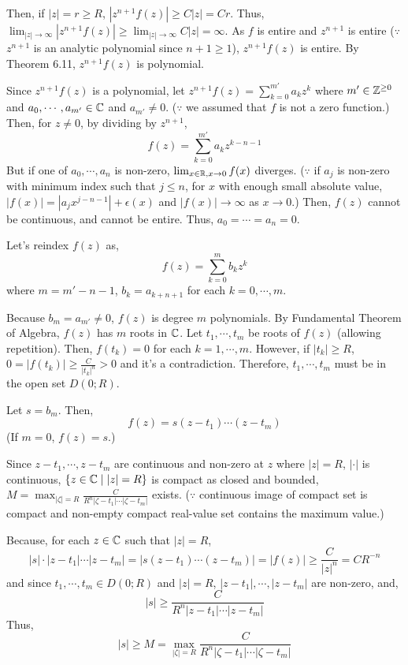 Then, if \(|z| = r \ge R\), \(|z^{n + 1} f(z)| \ge C |z| = Cr\).
Thus, \(\lim_{|z| \to \infty} |z^{n + 1} f(z)| \ge \lim_{|z| \to \infty} C |z| = \infty\).
As \(f\) is entire and \(z^{n + 1}\) is entire (\(\because\) \(z^{n + 1}\) is an analytic polynomial since \(n + 1 \ge 1\)), \(z^{n + 1}f(z)\) is entire.
By Theorem 6.11, \(z^{n + 1} f(z)\) is polynomial.

Since \(z^{n + 1} f(z)\) is a polynomial,
let \(z^{n + 1}f(z) = \sum_{k = 0}^{m'} a_k z^k\)
where \(m' \in \mathbb{Z}^{\ge 0}\) and
\(a_0, \cdots, a_{m'} \in \mathbb{C}\) and \(a_{m'} \neq 0\).
(\(\because\) we assumed that \(f\) is not a zero function.)
Then, for \(z \neq 0\), by dividing by \(z^{n + 1}\),
\[f(z) = \sum_{k = 0}^{m'} a_k z^{k - n - 1}\]
But if one of \(a_0, \cdots, a_{n}\) is non-zero,
\(\lim_{x \in \mathbb{R}, x \to 0} f(x)\) diverges.
(\(\because\) if \(a_j\) is non-zero with minimum index such that \(j \le n\),
 for \(x\) with enough small absolute value, \(|f(x)| = |a_j x^{j - n - 1}| + \epsilon(x)\) and \(|f(x)| \to \infty\) as \(x \to 0\).)
Then, \(f(z)\) cannot be continuous, and cannot be entire.
Thus, \(a_0 = \cdots = a_{n} = 0\).

Let's reindex \(f(z)\) as,
\[f(z) = \sum_{k = 0}^{m} b_k z^{k}\]
where \(m = m' - n - 1\), \(b_k = a_{k + n + 1}\) for each \(k = 0, \cdots, m\).

Because \(b_m = a_{m'} \neq 0\), \(f(z)\) is degree \(m\) polynomials.
By Fundamental Theorem of Algebra, \(f(z)\) has \(m\) roots in \(\mathbb{C}\).
Let \(t_1, \cdots, t_m\) be roots of \(f(z)\) (allowing repetition).
Then, \(f(t_k) = 0\) for each \(k = 1, \cdots, m\).
However, if \(|t_k| \ge R\),
\(0 = |f(t_k)| \ge \frac{C}{|t_k|^n} > 0\) and it's a contradiction.
Therefore, \(t_1, \cdots, t_m\) must be in the open set \(D(0; R)\).

Let \(s = b_m\). Then,
\[f(z) = s(z - t_1) \cdots (z - t_m)\]
(If \(m = 0\), \(f(z) = s\).)

Since \(z - t_1, \cdots, z - t_m\) are continuous and non-zero at \(z\) where \(|z| = R\),
\(|\cdot|\) is continuous,
\(\{z \in \mathbb{C} \mid |z| = R\}\) is compact as closed and bounded,
\(M = \max_{|\zeta| = R} \frac{C}{R^n |\zeta - t_1| \cdots |\zeta - t_m|}\)
exists.
(\(\because\) continuous image of compact set is compact and non-empty compact real-value set contains the maximum value.)

Because, for each \(z \in \mathbb{C}\) such that \(|z| = R\),
\[|s| \cdot |z - t_1| \cdots |z - t_m| = |s(z - t_1) \cdots (z - t_m)|
  = |f(z)| \ge \frac{C}{|z|^n} = CR^{-n}\]
and since \(t_1, \cdots, t_m \in D(0; R)\) and \(|z| = R\), \(|z - t_1|, \cdots, |z - t_m|\) are non-zero, and,
\[|s| \ge \frac{C}{R^n |z - t_1| \cdots |z - t_m|}\]
Thus,
\[|s| \ge M = \max_{|\zeta| = R} \frac{C}{R^n |\zeta - t_1| \cdots |\zeta - t_m|}\]

